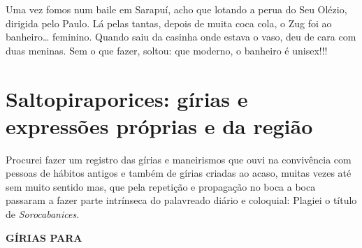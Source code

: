 \documentclass[12pt,brazil,]{book}
\begin{document}
Uma vez fomos num baile em Sarapuí, acho que lotando a perua do Seu
Olézio, dirigida pelo Paulo. Lá pelas tantas, depois de muita coca cola,
o Zug foi ao banheiro\ldots{} feminino. Quando saiu da casinha onde
estava o vaso, deu de cara com duas meninas. Sem o que fazer, soltou:
que moderno, o banheiro é unisex!!!

\section{Saltopiraporices: gírias e expressões próprias e da
região}\label{saltopiraporices-guxedrias-e-expressuxf5es-pruxf3prias-e-da-regiuxe3o}

Procurei fazer um registro das gírias e maneirismos que ouvi na
convivência com pessoas de hábitos antigos e também de gírias criadas ao
acaso, muitas vezes até sem muito sentido mas, que pela repetição e
propagação no boca a boca passaram a fazer parte intrínseca do
palavreado diário e coloquial: Plagiei o título de \emph{Sorocabanices}.

\textbf{GÍRIAS PARA}
\end{document}
